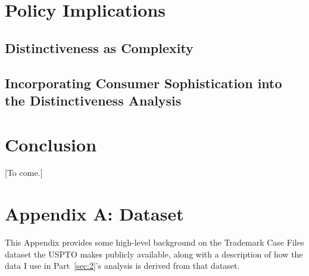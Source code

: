 \documentclass[letterpaper, 11pt, oneside]{article}
\begin{document}
\section{Policy Implications} \label{sec:3}

\subsection{Distinctiveness as Complexity}\label{subsec:3A}



\subsection{Incorporating Consumer Sophistication into the Distinctiveness Analysis}\label{subsec:3B}


\section*{Conclusion}

[To come.]

\newpage

\appendix
{}
\section*{Appendix A: Dataset}

This Appendix provides some high-level background on the Trademark Case Files dataset the USPTO makes publicly available, along with a description of how the data I use in Part~\ref{sec:2}'s analysis is derived from that dataset.
\end{document}
